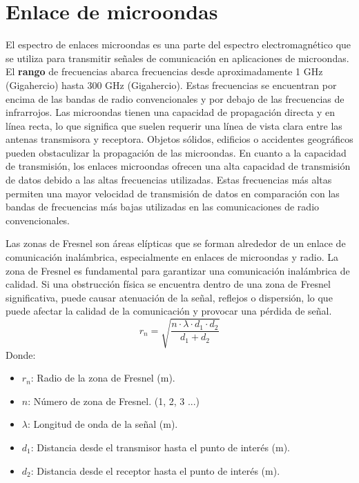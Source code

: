 \documentclass[
	12pt, %
	fleqn, %
	a4paper, %
	oneside, %
]{LegrandOrangeBook}
\begin{document}
\section{Enlace de microondas}
El espectro de enlaces microondas es una parte del espectro electromagnético que se utiliza para transmitir señales de comunicación en aplicaciones de microondas. El \textbf{rango} de frecuencias abarca frecuencias desde aproximadamente 1 GHz (Gigahercio) hasta 300 GHz (Gigahercio). Estas frecuencias se encuentran por encima de las bandas de radio convencionales y por debajo de las frecuencias de infrarrojos. Las microondas tienen una capacidad de propagación directa y en línea recta, lo que significa que suelen requerir una línea de vista clara entre las antenas transmisora y receptora. Objetos sólidos, edificios o accidentes geográficos pueden obstaculizar la propagación de las microondas. En cuanto a la capacidad de transmisión, los enlaces microondas ofrecen una alta capacidad de transmisión de datos debido a las altas frecuencias utilizadas. Estas frecuencias más altas permiten una mayor velocidad de transmisión de datos en comparación con las bandas de frecuencias más bajas utilizadas en las comunicaciones de radio convencionales.
\begin{definition}
Las zonas de Fresnel son áreas elípticas que se forman alrededor de un enlace de comunicación inalámbrica, especialmente en enlaces de microondas y radio. La zona de Fresnel es fundamental para garantizar una comunicación inalámbrica de calidad. Si una obstrucción física se encuentra dentro de una zona de Fresnel significativa, puede causar atenuación de la señal, reflejos o dispersión, lo que puede afectar la calidad de la comunicación y provocar una pérdida de señal.
\begin{equation}
r_n= \sqrt{\frac{{n \cdot \lambda \cdot d_1 \cdot d_2}}{{d_1 + d_2}}}
\label{eq:zonas fresnel}
\end{equation}
Donde:
\begin{itemize}
\item \textbf{$r_n$}: Radio de la zona de Fresnel (m).
\item \textbf{$n$}: Número de zona de Fresnel. (1, 2, 3 ...)
\item $\lambda$: Longitud de onda de la señal (m).
\item \textbf{$d_1$}: Distancia desde el transmisor hasta el punto de interés (m).
\item \textbf{$d_2$}: Distancia desde el receptor hasta el punto de interés (m).
\end{itemize}
\end{definition}
\end{document}
